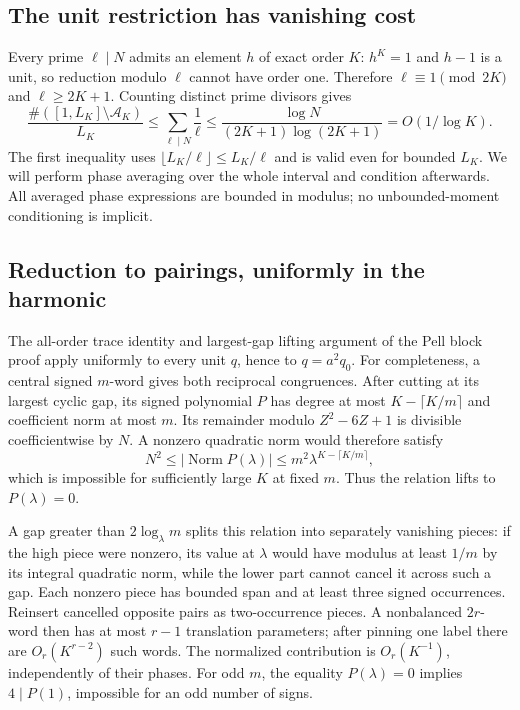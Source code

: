 \hypertarget{pell-harmonic-the-unit-restriction-has-vanishing-cost}{%
\subsection{The unit restriction has vanishing cost}\label{pell-harmonic-the-unit-restriction-has-vanishing-cost}}

Every prime \(\ell\mid N\) admits an element \(h\) of exact order \(K\):
\(h^K=1\) and \(h-1\) is a unit, so reduction modulo \(\ell\) cannot have order
one. Therefore \(\ell\equiv1\pmod{2K}\) and \(\ell\ge2K+1\). Counting distinct
prime divisors gives
\[
 \frac{\#([1,L_K]\setminus\mathcal A_K)}{L_K}
 \le\sum_{\ell\mid N}\frac1\ell
 \le\frac{\log N}{(2K+1)\log(2K+1)}
 =O(1/\log K).                                               \tag{H8}
\]
The first inequality uses \(\lfloor L_K/\ell\rfloor\le L_K/\ell\) and
is valid even for bounded \(L_K\). We will perform phase averaging over the
whole interval and condition afterwards. All averaged phase expressions
are bounded in modulus; no unbounded-moment conditioning is implicit.

\hypertarget{pell-harmonic-reduction-to-pairings-uniformly-in-the-harmonic}{%
\subsection{Reduction to pairings, uniformly in the harmonic}\label{pell-harmonic-reduction-to-pairings-uniformly-in-the-harmonic}}

The all-order trace identity and largest-gap lifting argument of the Pell
block proof apply uniformly to every unit \(q\), hence to \(q=a^2q_0\).
For completeness, a central signed \(m\)-word gives both reciprocal
congruences. After cutting at its largest cyclic gap, its signed polynomial
\(P\) has degree at most \(K-\lceil K/m\rceil\) and coefficient norm at most \(m\).
Its remainder modulo \(Z^2-6Z+1\) is divisible coefficientwise by \(N\).
A nonzero quadratic norm would therefore satisfy
\[
 N^2\le|\operatorname{Norm}P(\lambda)|
       \le m^2\lambda^{K-\lceil K/m\rceil},
\]
which is impossible for sufficiently large \(K\) at fixed \(m\).
Thus the relation lifts to \(P(\lambda)=0\).

A gap greater than \(2\log_\lambda m\) splits this relation into separately
vanishing pieces: if the high piece were nonzero, its value at \(\lambda\)
would have modulus at least \(1/m\) by its integral quadratic norm, while
the lower part cannot cancel it across such a gap. Each nonzero piece
has bounded span and at least three signed occurrences. Reinsert cancelled
opposite pairs as two-occurrence pieces. A nonbalanced \(2r\)-word then has
at most \(r-1\) translation parameters; after pinning one label there are
\(O_r(K^{r-2})\) such words. The normalized contribution is \(O_r(K^{-1})\),
independently of their phases. For odd \(m\), the equality \(P(\lambda)=0\)
implies \(4\mid P(1)\), impossible for an odd number of signs.

